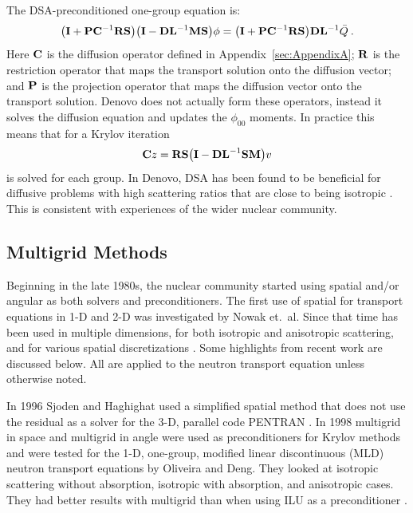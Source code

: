 The DSA-preconditioned one-group equation is:
%
\begin{equation}
  \bigl(\mathbf{I} + \mathbf{PC}^{-1}\mathbf{RS}\bigr) \bigl(\mathbf{I} - \mathbf{DL}^{-1}\mathbf{MS}\bigr) \phi = \bigl(\mathbf{I} + \mathbf{PC}^{-1}\mathbf{RS}\bigr)\mathbf{DL}^{-1}\bar{Q} \:. 
  \label{DSA1group}
\end{equation}
%
Here $\mathbf{C}$ is the diffusion operator defined in Appendix~\ref{sec:AppendixA}; $\mathbf{R}$ is the restriction operator that maps the transport solution onto the diffusion vector; and $\mathbf{P}$ is the projection operator that maps the diffusion vector onto the transport solution. Denovo does not actually form these operators, instead it solves the diffusion equation and updates the $\phi_{00}$ moments. In practice this means that for a Krylov iteration
%
\begin{equation}
  \mathbf{C}z = \mathbf{RS}\bigl(\mathbf{I} - \mathbf{DL}^{-1}\mathbf{SM}\bigr) v
\end{equation}
%
is solved for each group. In Denovo, DSA has been found to be beneficial for diffusive problems with high scattering ratios that are close to being isotropic \cite{Evans2009d}. This is consistent with experiences of the wider nuclear community.

\subsection{Multigrid Methods}
Beginning in the late 1980s, the nuclear community started using spatial \mg and/or angular \mg as both solvers and preconditioners. The first use of spatial \mg for transport equations in 1-D and 2-D was investigated by Nowak et.\ al. Since that time \mg has been used in multiple dimensions, for both isotropic and anisotropic scattering, and for various spatial discretizations \cite{Adams2002}. Some highlights from recent work are discussed below. All are applied to the \Sn neutron transport equation unless otherwise noted. 

In 1996 Sjoden and Haghighat used a simplified spatial \mg method that does not use the residual as a solver for the 3-D, parallel code PENTRAN \cite{Sjoden1996}. In 1998 multigrid in space and multigrid in angle were used as preconditioners for Krylov methods and were tested for the 1-D, one-group, modified linear discontinuous (MLD) neutron transport equations by Oliveira and Deng. They looked at isotropic scattering without absorption, isotropic with absorption, and anisotropic cases. They had better results with multigrid than when using ILU as a preconditioner \cite{Oliveira1998}.


